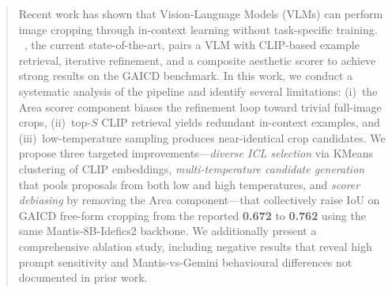 \begin{abstract}
Recent work has shown that Vision-Language Models (VLMs) can perform
image cropping through in-context learning without task-specific
training.  \baseline~\cite{cropper2025}, the current state-of-the-art,
pairs a VLM with CLIP-based example retrieval, iterative refinement,
and a composite aesthetic scorer to achieve strong results on the GAICD
benchmark.  In this work, we conduct a systematic analysis of the
\baseline pipeline and identify several limitations: (i)~the Area scorer
component biases the refinement loop toward trivial full-image crops,
(ii)~top-$S$ CLIP retrieval yields redundant in-context examples, and
(iii)~low-temperature sampling produces near-identical crop candidates.
We propose three targeted improvements---\emph{diverse ICL selection}
via KMeans clustering of CLIP embeddings, \emph{multi-temperature
candidate generation} that pools proposals from both low and high
temperatures, and \emph{scorer debiasing} by removing the Area
component---that collectively raise IoU on GAICD free-form cropping
from the reported \textbf{0.672} to \textbf{0.762} using the same
Mantis-8B-Idefics2 backbone.  We additionally present a comprehensive
ablation study, including negative results that reveal high prompt
sensitivity and Mantis-vs-Gemini behavioural differences not documented
in prior work.
\end{abstract}

